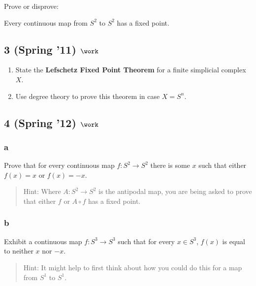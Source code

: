 Prove or disprove:

Every continuous map from \(S^2\) to \(S^2\) has a fixed point.

\hypertarget{spring-11-work-3}{%
\subsection{\texorpdfstring{3 (Spring '11)
\(\work\)}{3 (Spring '11) \textbackslash work}}\label{spring-11-work-3}}

\begin{enumerate}
\def\labelenumi{\alph{enumi}.}
\item
  State the \textbf{Lefschetz Fixed Point Theorem} for a finite
  simplicial complex \(X\).
\item
  Use degree theory to prove this theorem in case \(X = S^n\).
\end{enumerate}

\hypertarget{spring-12-work-3}{%
\subsection{\texorpdfstring{4 (Spring '12)
\(\work\)}{4 (Spring '12) \textbackslash work}}\label{spring-12-work-3}}

\hypertarget{a-5}{%
\subsubsection{a}\label{a-5}}

Prove that for every continuous map \(f : S^2 \to S^2\) there is some
\(x\) such that either \(f (x) = x\) or \(f (x) = -x\).

\begin{quote}
Hint: Where \(A : S^2 \to S^2\) is the antipodal map, you are being
asked to prove that either \(f\) or \(A \circ f\) has a fixed point.
\end{quote}

\hypertarget{b-5}{%
\subsubsection{b}\label{b-5}}

Exhibit a continuous map \(f : S^3 \to S^3\) such that for every
\(x \in S^3\), \(f (x)\) is equal to neither \(x\) nor \(-x\).

\begin{quote}
Hint: It might help to first think about how you could do this for a map
from \(S^1\) to \(S^1\).
\end{quote}

